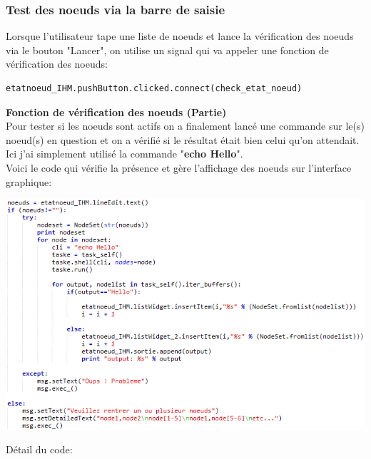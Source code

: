 \documentclass[a4paper,11pt]{article}
\begin{document}
\subsubsection{Test des noeuds via la barre de saisie}
\noindent
Lorsque l'utilisateur tape une liste de noeuds et lance la vérification des noeuds via le bouton "Lancer", on utilise un signal qui va appeler une fonction de vérification des noeuds:\\
\begin{lstlisting}
etatnoeud_IHM.pushButton.clicked.connect(check_etat_noeud)
\end{lstlisting}
\textbf{Fonction de vérification des noeuds (Partie)}\\
Pour tester si les noeuds sont actifs on a finalement lancé une commande sur le(s) noeud(s) en question et on a vérifié si le résultat était bien celui qu'on attendait. Ici j'ai simplement utilisé la commande "\textbf{echo Hello}".\\
Voici le code qui vérifie la présence et gère l'affichage des noeuds sur l'interface graphique:
\begin{flushleft}
\includegraphics[scale=1]{check_etatnoeud.png} 
\end{flushleft}
Détail du code:\\
\end{document}
